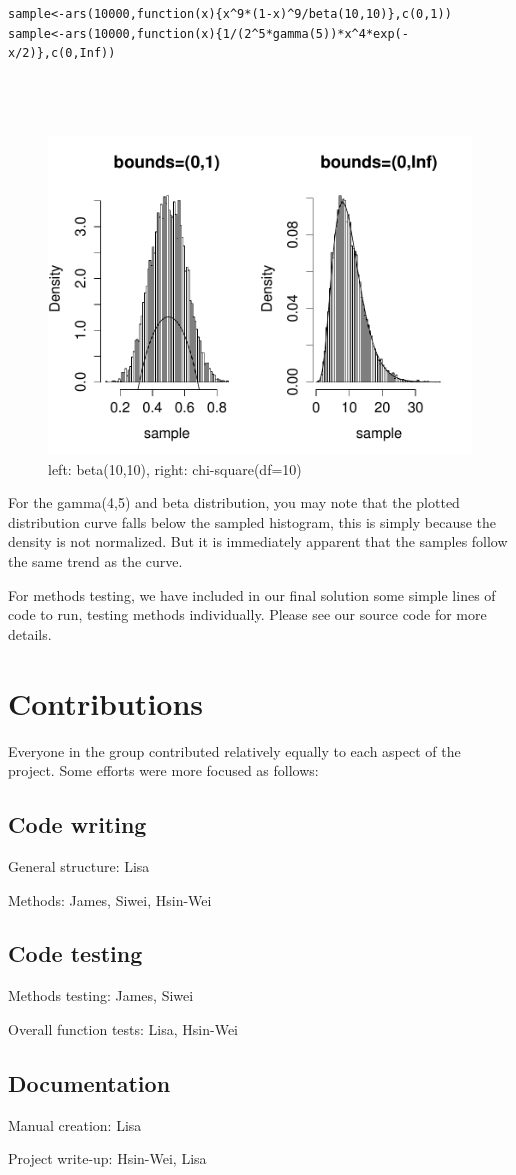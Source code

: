 \documentclass[11pt, oneside]{article}   	%
\begin{document}
\begin{lstlisting}[frame=single]
sample<-ars(10000,function(x){x^9*(1-x)^9/beta(10,10)},c(0,1))
sample<-ars(10000,function(x){1/(2^5*gamma(5))*x^4*exp(-x/2)},c(0,Inf))




\end{lstlisting}
\clearpage
\begin{figure}[htbp!]
 \centering
\caption{left: beta(10,10), right: chi-square(df=10)}
  \includegraphics[width=1.0\textwidth]{betachi}
\end{figure}

For the gamma(4,5) and beta distribution, you may note that the plotted distribution curve falls below the sampled histogram, this is simply because the density is not normalized.  But it is immediately apparent that the samples follow the same trend as the curve.  

For methods testing, we have included in our final solution some simple lines of code to run, testing methods individually.  Please see our source code for more details.  


\section{Contributions}

Everyone in the group contributed relatively equally to each aspect of the project.  Some efforts were more focused as follows:

\subsection*{Code writing}

General structure: Lisa

Methods: James, Siwei, Hsin-Wei

\subsection*{Code testing}

Methods testing: James, Siwei

Overall function tests: Lisa, Hsin-Wei

\subsection*{Documentation} 

Manual creation: Lisa

Project write-up:  Hsin-Wei, Lisa
\end{document}
